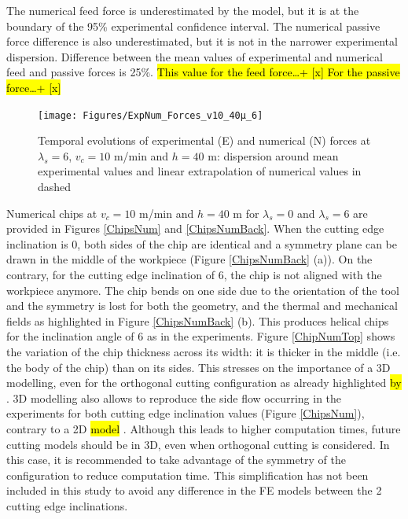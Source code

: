 \documentclass[preprint,12pt,times]{elsarticle}
\begin{document}
 The numerical feed force is underestimated by the model, but it is at the boundary of the 95\% experimental confidence interval. The numerical passive force difference is also underestimated, but it is not in the narrower experimental dispersion. Difference between the mean values of experimental and numerical feed and passive forces is 25\%. \hl{This value for the feed force\ldots + [x] For the passive force\ldots + [x]}

\begin{figure}[!h]
\centering
\texttt{[image: Figures/ExpNum\_Forces\_v10\_40µ\_6]}
\caption{Temporal evolutions of experimental (E) and numerical (N) forces at $\lambda_s = 6$\textdegree{}, $v_c = 10$ m/min and $h = 40$ \textmu{}m: dispersion around mean experimental values and linear extrapolation of numerical values in dashed}
\label{ExpNum_Forces_v10_40µ_6}
\end{figure}

Numerical chips at $v_c = 10$ m/min and $h = 40$ \textmu{}m for $\lambda_s = 0$\textdegree{} and $\lambda_s = 6$\textdegree{} are provided in Figures \ref{ChipsNum} and \ref{ChipsNumBack}. When the cutting edge inclination is 0\textdegree{}, both sides of the chip are identical and a symmetry plane can be drawn in the middle of the workpiece (Figure \ref{ChipsNumBack} (a)). On the contrary, for the cutting edge inclination of 6\textdegree{}, the chip is not aligned with the workpiece anymore. The chip bends on one side due to the orientation of the tool and the symmetry is lost for both the geometry, and the thermal and mechanical fields as highlighted in Figure \ref{ChipsNumBack} (b). This produces helical chips for the inclination angle of 6\textdegree{} as in the experiments. Figure \ref{ChipNumTop} shows the variation of the chip thickness across its width: it is thicker in the middle (i.e. the body of the chip) than on its sides. This stresses on the importance of a 3D modelling, even for the orthogonal cutting configuration as already highlighted \hl{by} \cite{Outeiro? Ambrosini? Hardt? Duco}. 3D modelling also allows to reproduce the side flow occurring in the experiments for both cutting edge inclination values (Figure \ref{ChipsNum}), contrary to a 2D \hl{model} \cite{}. Although this leads to higher computation times, future cutting models should be in 3D, even when orthogonal cutting is considered. In this case, it is recommended to take advantage of the symmetry of the configuration to reduce computation time. This simplification has not been included in this study to avoid any difference in the FE models between the 2 cutting edge inclinations.
\end{document}
